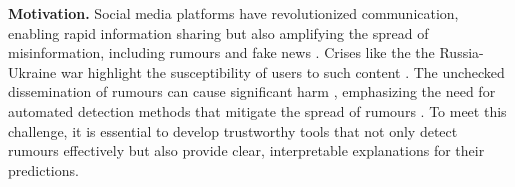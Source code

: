\textbf{Motivation.} Social media platforms have revolutionized communication, enabling rapid information sharing but also amplifying the spread of misinformation, including rumours and fake news \cite{vosoughi2018spread}. Crises like the the Russia-Ukraine war highlight the susceptibility of users to such content \cite{aimeur2023fake}. The unchecked dissemination of rumours can cause significant harm \cite{ahsan2019rumors}, emphasizing the need for automated detection methods that mitigate the spread of rumours \cite{thorne2018automated}. To meet this challenge, it is essential to develop trustworthy tools that not only detect rumours effectively but also provide clear, interpretable explanations for their predictions.



